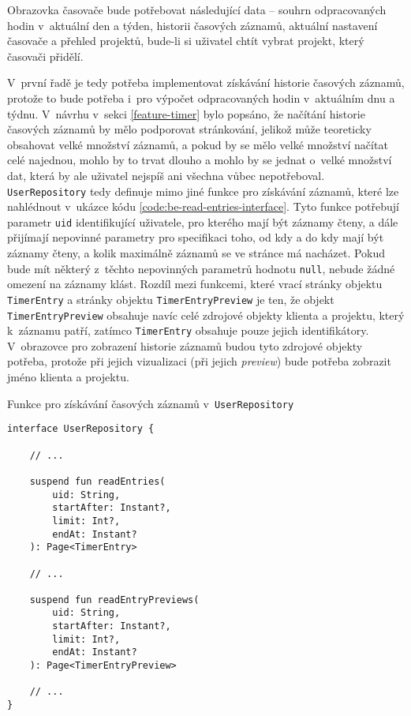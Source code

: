 Obrazovka časovače bude potřebovat následující data – souhrn odpracovaných hodin v~aktuální den a týden, historii časových záznamů, aktuální nastavení časovače a přehled projektů, bude-li si uživatel chtít vybrat projekt, který časovači přidělí.

V~první řadě je tedy potřeba implementovat získávání historie časových záznamů, protože to bude potřeba i~pro výpočet odpracovaných hodin v~aktuálním dnu a týdnu. V~návrhu v~sekci \ref{feature-timer} bylo popsáno, že načítání historie časových záznamů by mělo podporovat stránkování, jelikož může teoreticky obsahovat velké množství záznamů, a pokud by se mělo velké množství načítat celé najednou, mohlo by to trvat dlouho a mohlo by se jednat o~velké množství dat, která by ale uživatel nejspíš ani všechna vůbec nepotřeboval. \texttt{UserRepository} tedy definuje mimo jiné funkce pro získávání záznamů, které lze nahlédnout v~ukázce kódu \ref{code:be-read-entries-interface}. Tyto funkce potřebují parametr \texttt{uid} identifikující uživatele, pro kterého mají být záznamy čteny, a dále přijímají nepovinné parametry pro specifikaci toho, od kdy a do kdy mají být záznamy čteny, a kolik maximálně záznamů se ve stránce má nacházet. Pokud bude mít některý z~těchto nepovinných parametrů hodnotu \texttt{null}, nebude žádné omezení na záznamy klást. Rozdíl mezi funkcemi, které vrací stránky objektu \texttt{TimerEntry} a stránky objektu \texttt{TimerEntryPreview} je ten, že objekt \texttt{TimerEntryPreview} obsahuje navíc celé zdrojové objekty klienta a projektu, který k~záznamu patří, zatímco \texttt{TimerEntry} obsahuje pouze jejich identifikátory. V~obrazovce pro zobrazení historie záznamů budou tyto zdrojové objekty potřeba, protože při jejich vizualizaci (při jejich \emph{preview}) bude potřeba zobrazit jméno klienta a projektu.

\begin{listing}
\caption{Funkce pro získávání časových záznamů v~\texttt{UserRepository}}\label{code:be-read-entries-interface}
\begin{verbatim}
interface UserRepository {

    // ...
    
    suspend fun readEntries(
        uid: String,
        startAfter: Instant?,
        limit: Int?,
        endAt: Instant?
    ): Page<TimerEntry>
    
    // ...
    
    suspend fun readEntryPreviews(
        uid: String,
        startAfter: Instant?,
        limit: Int?,
        endAt: Instant?
    ): Page<TimerEntryPreview>
    
    // ...
}
\end{verbatim}
\end{listing}

